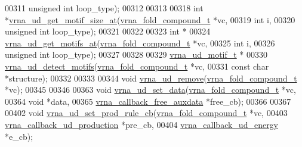 \begin{DoxyCode}
00311                         \textcolor{keywordtype}{unsigned} \textcolor{keywordtype}{int}          loop\_type);
00312 
00313 
00318 \textcolor{keywordtype}{int} *\mbox{\hyperlink{unstructured__domains_8h_aea51485feeafed1f93222ba7db9fc3b1}{vrna\_ud\_get\_motif\_size\_at}}(\mbox{\hyperlink{group__fold__compound_structvrna__fc__s}{vrna\_fold\_compound\_t}} *vc,
00319                                \textcolor{keywordtype}{int}                  i,
00320                                \textcolor{keywordtype}{unsigned} \textcolor{keywordtype}{int}         loop\_type);
00321 
00322 
00323 \textcolor{keywordtype}{int} *
00324 \mbox{\hyperlink{unstructured__domains_8h_a25312acc79406b3bf54b2ddcf120e0cf}{vrna\_ud\_get\_motifs\_at}}(\mbox{\hyperlink{group__fold__compound_structvrna__fc__s}{vrna\_fold\_compound\_t}}  *vc,
00325                       \textcolor{keywordtype}{int}                   i,
00326                       \textcolor{keywordtype}{unsigned} \textcolor{keywordtype}{int}          loop\_type);
00327 
00328 
00329 \mbox{\hyperlink{structvrna__unstructured__domain__motif__s}{vrna\_ud\_motif\_t}} *
00330 \mbox{\hyperlink{unstructured__domains_8h_a7ae51765e12f25b6ab0e6ff297c0a2d4}{vrna\_ud\_detect\_motifs}}(\mbox{\hyperlink{group__fold__compound_structvrna__fc__s}{vrna\_fold\_compound\_t}}  *vc,
00331                       \textcolor{keyword}{const} \textcolor{keywordtype}{char}            *structure);
00332 
00333 
00344 \textcolor{keywordtype}{void}  \mbox{\hyperlink{group__domains__up_gada59cb0c498b812eadd010811af3f2d4}{vrna\_ud\_remove}}(\mbox{\hyperlink{group__fold__compound_structvrna__fc__s}{vrna\_fold\_compound\_t}} *vc);
00345 
00346 
00363 \textcolor{keywordtype}{void}  \mbox{\hyperlink{group__domains__up_gac1f18c312b91d80089534a87d956e58b}{vrna\_ud\_set\_data}}(\mbox{\hyperlink{group__fold__compound_structvrna__fc__s}{vrna\_fold\_compound\_t}}       *vc,
00364                        \textcolor{keywordtype}{void}                       *data,
00365                        \mbox{\hyperlink{group__fold__compound_ga7806651f51b195013839a218b3bbd5a3}{vrna\_callback\_free\_auxdata}} *free\_cb);
00366 
00367 
00402 \textcolor{keywordtype}{void} \mbox{\hyperlink{group__domains__up_ga745a99f0bc72898d54de16f6e538828a}{vrna\_ud\_set\_prod\_rule\_cb}}(\mbox{\hyperlink{group__fold__compound_structvrna__fc__s}{vrna\_fold\_compound\_t}}        *vc,
00403                               \mbox{\hyperlink{group__domains__up_ga4fdfc02c1b660c07f2d887772f02a0a1}{vrna\_callback\_ud\_production}} *pre\_cb,
00404                               \mbox{\hyperlink{group__domains__up_ga75825c57d0bfde4ae4f95c044260c5c3}{vrna\_callback\_ud\_energy}}     *e\_cb);

\end{DoxyCode}

